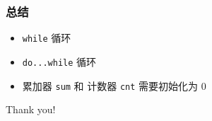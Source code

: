 \begin{frame}[fragile]
    \frametitle{总结}

    \begin{itemize}
        \item \lstinline|while| 循环
        \item \lstinline|do...while| 循环
        \item 累加器 \lstinline|sum| 和 计数器 \lstinline|cnt| 需要初始化为 $0$
    \end{itemize}
\end{frame}

\begin{frame}
    \begin{center}
        {\Huge Thank you!}
    \end{center}
\end{frame}


